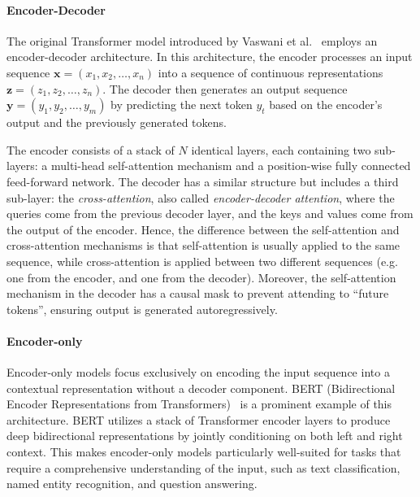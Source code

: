 
\paragraph{Encoder-Decoder}

The original Transformer model introduced by Vaswani et al.~\cite{vaswani_attention_2017} employs an encoder-decoder architecture. In this architecture, the encoder processes an input sequence $\mathbf{x} = (x_1, x_2, \dots, x_n)$ into a sequence of continuous representations $\mathbf{z} = (z_1, z_2, \dots, z_n)$. The decoder then generates an output sequence $\mathbf{y} = (y_1, y_2, \dots, y_m)$ by predicting the next token $y_t$ based on the encoder's output and the previously generated tokens.

The encoder consists of a stack of $N$ identical layers, each containing two sub-layers: a multi-head self-attention mechanism and a position-wise fully connected feed-forward network. The decoder has a similar structure but includes a third sub-layer: the \emph{cross-attention}, also called \emph{encoder-decoder attention}, where the queries come from the previous decoder layer, and the keys and values come from the output of the encoder. Hence, the difference between the self-attention and cross-attention mechanisms is that self-attention is usually applied to the same sequence, while cross-attention is applied between two different sequences (e.g. one from the encoder, and one from the decoder). Moreover, the self-attention mechanism in the decoder has a causal mask to prevent attending to ``future tokens'', ensuring output is generated autoregressively.

\paragraph{Encoder-only}

Encoder-only models focus exclusively on encoding the input sequence into a contextual representation without a decoder component. BERT (Bidirectional Encoder Representations from Transformers)~\cite{devlin_bert_2019} is a prominent example of this architecture. BERT utilizes a stack of Transformer encoder layers to produce deep bidirectional representations by jointly conditioning on both left and right context. This makes encoder-only models particularly well-suited for tasks that require a comprehensive understanding of the input, such as text classification, named entity recognition, and question answering.

